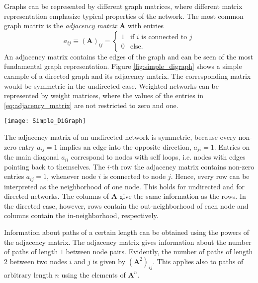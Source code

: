 \documentclass[openright,twoside,headsepline]{scrbook}
\begin{document}
Graphs can be represented by different graph matrices, where different matrix representation emphasize typical properties of the network.
The most common graph matrix is the \emph{adjacency matrix} $\mathbf{A}$ with entries
\begin{equation}\label{eq:adjacency_matrix}
a_{ij}\equiv (\mathbf{A})_{ij}= 
\begin{cases}
1 & \text{if $i$ is connected to $j$} \\
0 & \text{else.}
\end{cases} 
\end{equation}
An adjacency matrix contains the edges of the graph and can be seen of the most fundamental graph representation.
Figure \ref{fig:simple_digraph} shows a simple example of a directed graph and its adjacency matrix.
The corresponding matrix would be symmetric in the undirected case.
Weighted networks can be represented by weight matrices, where the values of the entries in \eqref{eq:adjacency_matrix} are not restricted to zero and one.
%
\begin{SCfigure}%
\texttt{[image: Simple\_DiGraph]}
\caption[Adjacency matrix.]{A simple directed network. The corresponding adjacency matrix is
\[
\mathbf{A}=\left(\begin{array}{cccc}0 & 1 & 1 & 0 \\0 & 0 & 0 & 1 \\0 & 1 & 0 & 0 \\0 & 1 & 1 & 0\end{array}\right).
\]
}
\label{fig:simple_digraph}
\end{SCfigure}

The adjacency matrix of an undirected network is symmetric, because every non-zero entry $a_{ij}=1$ implies an edge into the opposite direction, $a_{ji}=1$.
Entries on the main diagonal $a_{ii}$ correspond to nodes with self loops, i.e. nodes with edges pointing back to themselves.
The $i$-th row the adjacency matrix contains non-zero entries $a_{ij}=1$, whenever node $i$ is connected to node $j$.
Hence, every row can be interpreted as the neighborhood of one node.
This holds for undirected and for directed networks.
The columns of $\mathbf{A}$ give the same information as the rows.
In the directed case, however, rows contain the out-neighborhood of each node and columns contain the in-neighborhood, respectively.

Information about paths of a certain length can be obtained using the powers of the adjacency matrix.
The adjacency matrix gives information about the number of paths of length $1$ between node pairs.
Evidently, the number of paths of length $2$ between two nodes $i$ and $j$ is given by $(\mathbf{A}^2)_{ij}$.
This applies also to paths of arbitrary length $n$ using the elements of $\mathbf{A}^n$.
\end{document}
